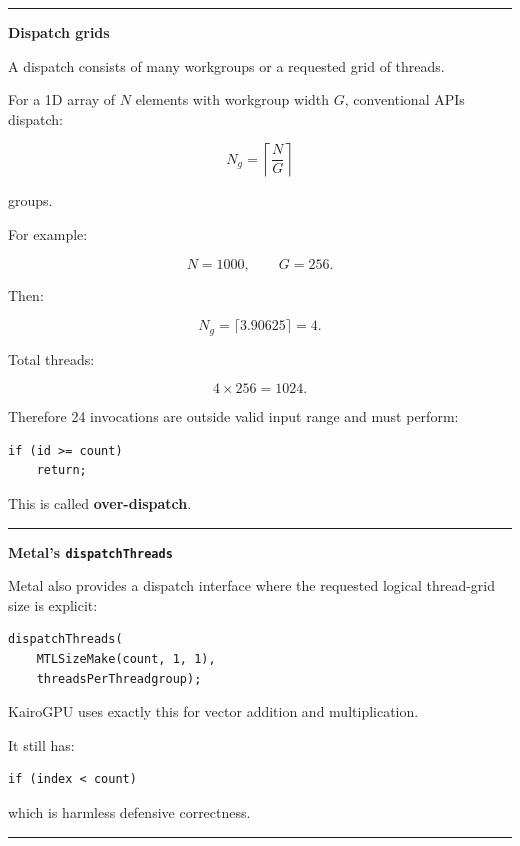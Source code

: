 \begin{center}\rule{0.5\linewidth}{0.5pt}\end{center}

\textbf{Dispatch grids}

A dispatch consists of many workgroups or a requested grid of threads.

For a 1D array of \(N\) elements with workgroup width \(G\), conventional APIs dispatch:

\[
\boxed{
N_g=
\left\lceil
\frac NG
\right\rceil
}
\]

groups.

For example:

\[
N=1000,
\qquad
G=256.
\]

Then:

\[
N_g=
\lceil3.90625\rceil
=
4.
\]

Total threads:

\[
4\times256=1024.
\]

Therefore 24 invocations are outside valid input range and must perform:

\protect{}\label{9wj2yb}%
\begin{verbatim}
if (id >= count)
    return;
\end{verbatim}

This is called \textbf{over-dispatch}.

\begin{center}\rule{0.5\linewidth}{0.5pt}\end{center}

\textbf{Metal's \texttt{dispatchThreads}}

Metal also provides a dispatch interface where the requested logical thread-grid size is explicit:

\protect{}\label{d2ts06}%
\begin{verbatim}
dispatchThreads(
    MTLSizeMake(count, 1, 1),
    threadsPerThreadgroup);
\end{verbatim}

KairoGPU uses exactly this for vector addition and multiplication.

It still has:

\protect{}\label{ccmw1t}%
\begin{verbatim}
if (index < count)
\end{verbatim}

which is harmless defensive correctness.

\begin{center}\rule{0.5\linewidth}{0.5pt}\end{center}

